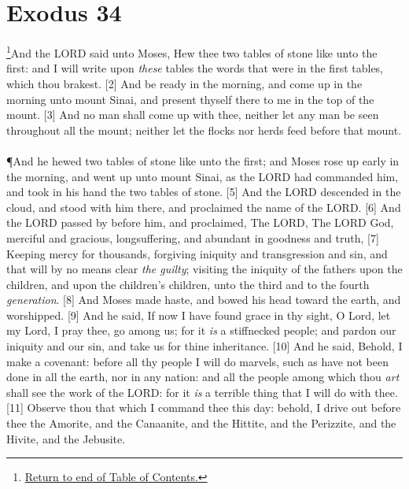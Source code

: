 \chapter{Exodus 34}
\footnote{\textcolor[rgb]{0.00,0.25,0.00}{\hyperlink{ExodusTTOC}{Return to end of Table of Contents.}}}\textcolor[rgb]{0.00,0.00,1.00}{And the LORD said unto Moses, Hew thee two tables of stone like unto the first: and I will write upon \emph{these} tables the words that were in the first tables, which thou brakest.}
[2] \textcolor[rgb]{0.00,0.00,1.00}{And be ready in the morning, and come up in the morning unto mount Sinai, and present thyself there to me in the top of the mount.}
[3] \textcolor[rgb]{0.00,0.00,1.00}{And no man shall come up with thee, neither let any man be seen throughout all the mount; neither let the flocks nor herds feed before that mount.}\\
\\
\P \textcolor[rgb]{0.00,0.00,1.00}{And he hewed two tables of stone like unto the first; and Moses rose up early in the morning, and went up unto mount Sinai, as the LORD had commanded him, and took in his hand the two tables of stone.}
[5] \textcolor[rgb]{0.00,0.00,1.00}{And the LORD descended in the cloud, and stood with him there, and proclaimed the name of the LORD.}
[6] \textcolor[rgb]{0.00,0.00,1.00}{And the LORD passed by before him, and proclaimed, The LORD, The LORD God, merciful and gracious, longsuffering, and abundant in goodness and truth,}
[7] \textcolor[rgb]{0.00,0.00,1.00}{Keeping mercy for thousands, forgiving iniquity and transgression and sin, and that will by no means clear \emph{the guilty}; visiting the iniquity of the fathers upon the children, and upon the children's children, unto the third and to the fourth \emph{generation}.}
[8] \textcolor[rgb]{0.00,0.00,1.00}{And Moses made haste, and bowed his head toward the earth, and worshipped.}
[9] \textcolor[rgb]{0.00,0.00,1.00}{And he said, If now I have found grace in thy sight, O Lord, let my Lord, I pray thee, go among us; for it \emph{is} a stiffnecked people; and pardon our iniquity and our sin, and take us for thine inheritance.}
[10] \textcolor[rgb]{0.00,0.00,1.00}{And he said, Behold, I make a covenant: before all thy people I will do marvels, such as have not been done in all the earth, nor in any nation: and all the people among which thou \emph{art} shall see the work of the LORD: for it \emph{is} a terrible thing that I will do with thee.}
[11] \textcolor[rgb]{0.00,0.00,1.00}{Observe thou that which I command thee this day: behold, I drive out before thee the Amorite, and the Canaanite, and the Hittite, and the Perizzite, and the Hivite, and the Jebusite.}
